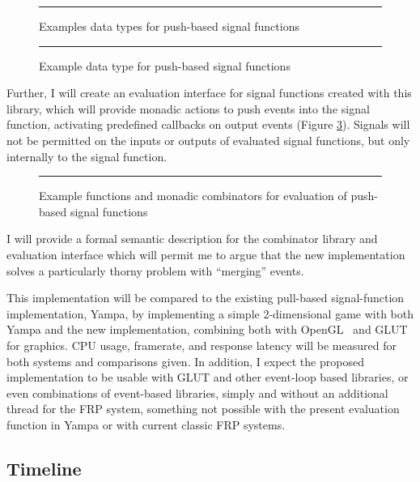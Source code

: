 \begin{figure}

\hrule
\caption{Examples data types for push-based signal functions}
\label{fig:proposed_work_example_signalvectors}
\end{figure}

\begin{figure}

\hrule
\caption{Example data type for push-based signal functions}
\label{fig:proposed_work_example_signalfunctions}
\end{figure}

Further, I will create an evaluation interface for signal functions created with this library, which will provide monadic actions to push
events into the signal function, activating predefined callbacks on output events (Figure \ref{fig:proposed_work_example_evalmonad}). Signals
will not be permitted on the inputs or outputs of evaluated signal functions, but only internally to the signal function.

\begin{figure}

\hrule
\caption{Example functions and monadic combinators for evaluation of push-based signal functions}
\label{fig:proposed_work_example_evalmonad}
\end{figure}

I will provide a formal semantic description for the combinator library and evaluation interface which will permit me to argue that the
new implementation solves a particularly thorny problem with ``merging'' events.

This implementation will be compared to the existing pull-based signal-function implementation, Yampa, by implementing a simple
2-dimensional game with both Yampa and the new implementation, combining both with OpenGL~\cite{Akeley2011} and GLUT~\cite{Kilgard96} for graphics. CPU usage, framerate,
and response latency will be measured for both systems and comparisons given. In  addition, I expect the proposed implementation to be usable with
GLUT and other event-loop based libraries, or even combinations of event-based libraries, simply and without an additional thread for the
FRP system, something not possible with the present evaluation function in Yampa or with current classic FRP systems.

\subsection{Timeline}
\label{subsection:ProposedWork:Timeline}

